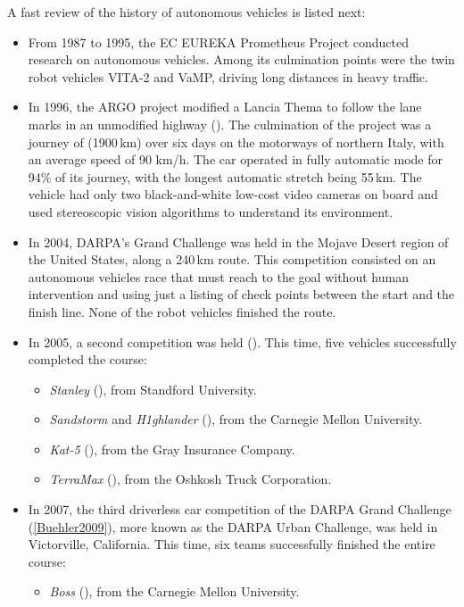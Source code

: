 A fast review of the history of autonomous vehicles is listed next:
\begin{itemize}
\item From 1987 to 1995, the EC EUREKA Prometheus Project conducted research on autonomous vehicles. Among its culmination points were the twin robot vehicles VITA-2 and VaMP, driving long distances in heavy traffic.
\item In 1996, the ARGO project modified a Lancia Thema to follow the lane marks in an unmodified highway (\cite{Broggi1999}). The culmination of the project was a journey of (1900\,km) over six days on the motorways of northern Italy, with an average speed of 90 km/h. The car operated in fully automatic mode for 94\% of its journey, with the longest automatic stretch being 55\,km. The vehicle had only two black-and-white low-cost video cameras on board and used stereoscopic vision algorithms to understand its environment. 
 \item In 2004, DARPA's Grand Challenge was held in the Mojave Desert region of the United States, along a 240\,km route. This competition consisted on an autonomous vehicles race that must reach to the goal without human intervention and using just a listing of check points between the start and the finish line. None of the robot vehicles finished the route.
 \item In 2005, a second competition was held (\cite{Buehler2007}). This time, five vehicles successfully completed the course:
 \begin{itemize}
  \item \emph{Stanley} (\cite{thrun2006stanley}), from Standford University.
  \item \emph{Sandstorm} and \emph{H1ghlander} (\cite{urmson2004high}), from the Carnegie Mellon University.
  \item \emph{Kat-5} (\cite{trepagnier2006kat}), from the Gray Insurance Company.
  \item \emph{TerraMax} (\cite{ozguner2004team}), from the Oshkosh Truck Corporation.
 \end{itemize}
 \item In 2007, the third driverless car competition of the DARPA Grand Challenge (\ref{Buehler2009}), more known as the DARPA Urban Challenge, was held in Victorville, California. This time, six teams successfully finished the entire course:
 \begin{itemize}
  \item \emph{Boss} (\cite{Urmson2008}), from the Carnegie Mellon University.

\end{itemize}
\end{itemize}

